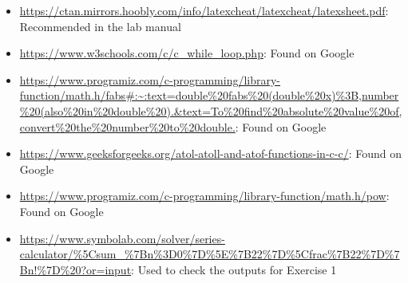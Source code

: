\documentclass{article}
\begin{document}
\begin{flushleft}
\begin{itemize}
  \item{\url{https://ctan.mirrors.hoobly.com/info/latexcheat/latexcheat/latexsheet.pdf}: Recommended in the lab manual}
  \item{\url{https://www.w3schools.com/c/c_while_loop.php}: Found on Google}
  \item{\url{https://www.programiz.com/c-programming/library-function/math.h/fabs#:~:text=double%20fabs%20(double%20x)%3B,number%20(also%20in%20double%20).&text=To%20find%20absolute%20value%20of,convert%20the%20number%20to%20double.}: Found on Google}
  \item{\url{https://www.geeksforgeeks.org/atol-atoll-and-atof-functions-in-c-c/}: Found on Google}
  \item{\url{https://www.programiz.com/c-programming/library-function/math.h/pow}: Found on Google}
  \item{\url{https://www.symbolab.com/solver/series-calculator/%5Csum_%7Bn%3D0%7D%5E%7B22%7D%5Cfrac%7B22%7D%7Bn!%7D%20?or=input}: Used to check the outputs for Exercise 1}
\end{itemize}
\end{flushleft}
\end{document}
